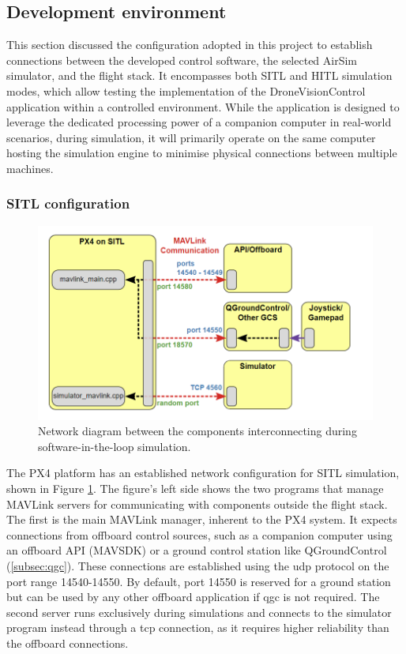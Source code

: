 \subsection{Development environment}

This section discussed the configuration adopted in this project to establish connections between the developed control software, the selected AirSim simulator, and the flight stack. It encompasses both SITL and HITL simulation modes, which allow testing the implementation of the DroneVisionControl application within a controlled environment. While the application is designed to leverage the dedicated processing power of a companion computer in real-world scenarios, during simulation, it will primarily operate on the same computer hosting the simulation engine to minimise physical connections between multiple machines.

\subsubsection{SITL configuration}

\begin{figure}
  \centering
  \includegraphics[width=\textwidth,keepaspectratio]{img/px4-ports.png}
  \caption{Network diagram between the components interconnecting during software-in-the-loop simulation.}
  \label{fig:px4-ports}
\end{figure}

The PX4 platform has an established network configuration for SITL simulation, shown in Figure \ref{fig:px4-ports}. The figure’s left side shows the two programs that manage MAVLink servers for communicating with components outside the flight stack. The first is the main MAVLink manager, inherent to the PX4 system. It expects connections from offboard control sources, such as a companion computer using an offboard API (MAVSDK) or a ground control station like QGroundControl (\ref{subsec:qgc}). These connections are established using the \acrshort{udp} protocol on the port range 14540-14550. By default, port 14550 is reserved for a ground station but can be used by any other offboard application if \acrshort{qgc} is not required.
The second server runs exclusively during simulations and connects to the simulator program instead through a \acrshort{tcp} connection, as it requires higher reliability than the offboard connections.

